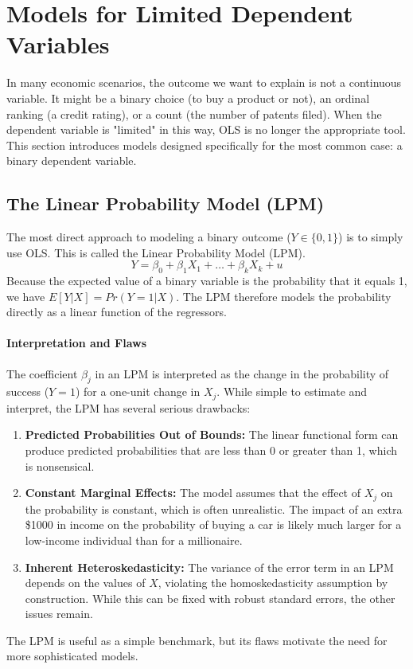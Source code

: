 \documentclass{article}
\providecommand{\tightlist}{
  \setlength{\itemsep}{0pt}
  \setlength{\parskip}{0pt}}
\begin{document}
\section{Models for Limited Dependent Variables}
\label{sec:ldv_models}

In many economic scenarios, the outcome we want to explain is not a continuous variable. It might be a binary choice (to buy a product or not), an ordinal ranking (a credit rating), or a count (the number of patents filed). When the dependent variable is "limited" in this way, OLS is no longer the appropriate tool. This section introduces models designed specifically for the most common case: a binary dependent variable.

\subsection{The Linear Probability Model (LPM)}
\label{sub:lpm}

The most direct approach to modeling a binary outcome ($Y \in \{0, 1\}$) is to simply use OLS. This is called the Linear Probability Model (LPM).
\begin{equation}
    Y = \beta_0 + \beta_1 X_1 + \dots + \beta_k X_k + u
\end{equation}
Because the expected value of a binary variable is the probability that it equals 1, we have $E[Y|X] = Pr(Y=1|X)$. The LPM therefore models the probability directly as a linear function of the regressors.

\paragraph{Interpretation and Flaws}
The coefficient $\beta_j$ in an LPM is interpreted as the change in the probability of success ($Y=1$) for a one-unit change in $X_j$. While simple to estimate and interpret, the LPM has several serious drawbacks:
\begin{enumerate}
    \tightlist
    \item \textbf{Predicted Probabilities Out of Bounds:} The linear functional form can produce predicted probabilities that are less than 0 or greater than 1, which is nonsensical.
    \item \textbf{Constant Marginal Effects:} The model assumes that the effect of $X_j$ on the probability is constant, which is often unrealistic. The impact of an extra \$1000 in income on the probability of buying a car is likely much larger for a low-income individual than for a millionaire.
    \item \textbf{Inherent Heteroskedasticity:} The variance of the error term in an LPM depends on the values of $X$, violating the homoskedasticity assumption by construction. While this can be fixed with robust standard errors, the other issues remain.
\end{enumerate}
The LPM is useful as a simple benchmark, but its flaws motivate the need for more sophisticated models.
\end{document}
